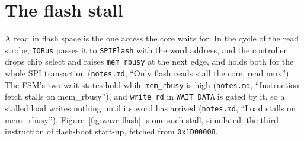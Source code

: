 \documentclass[11pt,a4paper]{report}
\newcommand{\notes}[1]{(\texttt{notes.md}, ``#1'')}
\begin{document}
\section{The flash stall}

A read in flash space is the one access the core waits for. In the cycle of the read
strobe, \texttt{IOBus} passes it to \texttt{SPIFlash} with the word address, and the controller
drops chip select and raises \texttt{mem\_rbusy} at the next edge, and holds both for the
whole SPI transaction \notes{Only flash reads stall the core, read mux}. The FSM's two wait
states hold while \texttt{mem\_rbusy} is high \notes{Instruction fetch stalls on mem\_rbusy},
and \texttt{write\_rd} in \texttt{WAIT\_DATA} is gated by it, so a stalled load writes nothing
until its word has arrived \notes{Load stalls on mem\_rbusy}.
Figure~\ref{fig:wave-flash} is one such stall, simulated: the third instruction of
flash-boot start-up, fetched from \texttt{0x1D00008}.
\end{document}
